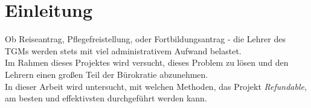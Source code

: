 \chapter{Einleitung} 
Ob Reiseantrag, Pflegefreistellung, oder Fortbildungsantrag - die Lehrer des TGMs werden stets mit viel administrativem Aufwand belastet. 
~\\
Im Rahmen dieses Projektes wird versucht, dieses Problem zu lösen und den Lehrern einen großen Teil der Bürokratie abzunehmen.
~\\
In dieser Arbeit wird untersucht, mit welchen Methoden, das Projekt \textit{Refundable}, am besten und effektivsten durchgeführt werden kann.